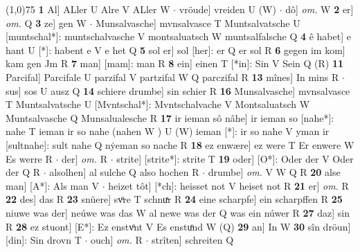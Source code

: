 \documentclass[8pt,a4paper,notitlepage]{article}
\begin{document}
\begin{table}[ht]
\begin{minipage}[t]{0.5\linewidth}
\line(1,0){75} \newline
\textbf{1} Al] ALler U Alre V ALler W  $\cdot$ vröude] vreiden U (W)  $\cdot$ dô] \textit{om.} W \textbf{2} er] \textit{om.} Q \textbf{3} ze] gen W  $\cdot$ Munsalvasche] mvnsalvasce T Muntsalvatsche U [muntschal*]: muntschalvasche V montsaluatsch W muntsalfalsche Q \textbf{4} ê habet] e hant U [*]: habent e V e het Q \textbf{5} sol er] sol [her]: er Q er sol R \textbf{6} gegen im kom] kam gen Jm R \textbf{7} man] [mam]: man R \textbf{8} ein] einen T [*in]: Sin V Sein Q (R) \textbf{11} Parcifal] Parcifale U parzifal V partzifal W Q parczifal R \textbf{13} mînes] In mins R  $\cdot$ sus] sos U ausz Q \textbf{14} schiere drumbe] sin schier R \textbf{16} Munsalvasche] mvnsalvasce T Muntsalvatsche U [Mvntschal*]: Mvntschalvache V Montsaluatsch W Muntsalvasche Q Munsalualesche R \textbf{17} ir ieman sô nâhe] ir ieman so [nahe*]: nahe T ieman ir so nahe (nahen W ) U (W) ieman [*]: ir so nahe V yman ir [sultnahe]: sult nahe Q nẏeman so nache R \textbf{18} ez enwære] ez were T Er enwere W Es werre R  $\cdot$ der] \textit{om.} R  $\cdot$ strite] [strite*]: strite T \textbf{19} oder] [O*]: Oder der V Oder der Q R  $\cdot$ alsolhen] al sulche Q also hochen R  $\cdot$ drumbe] \textit{om.} V W Q R \textbf{20} alse man] [A*]: Als man V  $\cdot$ heizet tôt] [*ch]: heisset not V heiset not R \textbf{21} er] \textit{om.} R \textbf{22} des] das R \textbf{23} snüere] svͦre T schnuͯr R \textbf{24} eine scharpfe] ein scharpffen R \textbf{25} niuwe was der] neúwe was das W al newe was der Q was ein núwer R \textbf{27} daz] sin R \textbf{28} ez stuont] [E*]: Ez enstvͦnt V Es enstuͦnd W (Q) \textbf{29} an] In W \textbf{30} sîn dröun] [din]: Sin drovn T  $\cdot$ ouch] \textit{om.} R  $\cdot$ strîten] schreiten Q \newline
\end{minipage}
\end{table}
\end{document}
